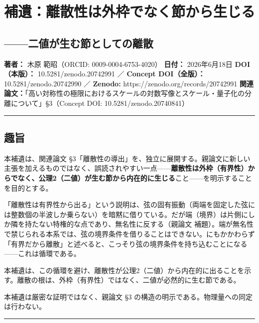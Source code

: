 \documentclass[11pt]{ltjsarticle}
\begin{document}
\section{補遺：離散性は外枠でなく節から生じる}\label{ux88dcux907aux96e2ux6563ux6027ux306fux5916ux67a0ux3067ux306aux304fux7bc0ux304bux3089ux751fux3058ux308b}

\subsection{------二値が生む節としての離散}\label{ux4e8cux5024ux304cux751fux3080ux7bc0ux3068ux3057ux3066ux306eux96e2ux6563}

\textbf{著者：} 木原 範昭（ORCID: 0009-0004-6753-4020） \textbf{日付：}
2026年6月18日 \textbf{DOI（本版）：} 10.5281/zenodo.20742991 ／
\textbf{Concept DOI（全版）：} 10.5281/zenodo.20742990 ／
\textbf{Zenodo:} https://zenodo.org/records/20742991
\textbf{関連論文：}「高い対称性の極限におけるスケールの対数写像とスケール・量子化の分離について」§3（Concept
DOI: 10.5281/zenodo.20740841）

\begin{center}\rule{0.5\linewidth}{0.5pt}\end{center}

\subsection{趣旨}\label{ux8da3ux65e8}

本補遺は、関連論文
§3「離散性の導出」を、独立に展開する。親論文に新しい主張を加えるものではなく、誤読されやすい一点------\textbf{離散性は外枠（有界性）からでなく、公理2（二値）が生む節から内在的に生じる}こと------を明示することを目的とする。

「離散性は有界性から出る」という説明は、弦の固有振動（両端を固定した弦には整数個の半波しか乗らない）を暗黙に借りている。だが端（境界）は片側にしか隣を持たない特権的な点であり、無名性に反する（親論文
補題）。端が無名性で禁じられる本系では、弦の境界条件を借りることはできない。にもかかわらず「有界だから離散」と述べると、こっそり弦の境界条件を持ち込むことになる------これは循環である。

本補遺は、この循環を避け、離散性が公理2（二値）から内在的に出ることを示す。離散の根は、外枠（有界性）ではなく、二値が必然的に生む節である。

本補遺は厳密な証明ではなく、親論文 §3
の構造の明示である。物理量への同定は行わない。

\begin{center}\rule{0.5\linewidth}{0.5pt}\end{center}
\end{document}
